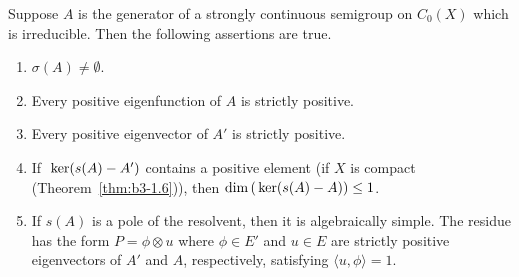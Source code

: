 \begin{proposition}\label{prop:b3-3.5}
	Suppose $A$ is the generator of a strongly continuous semigroup on $C_{0}(X)$ which is irreducible.
	Then the following assertions are true.
	\begin{enumerate}[\upshape (i)]
		\item 
		$\sigma(A) \neq \emptyset$.
		
		\item 
		Every positive eigenfunction of\/ $A$ is strictly positive.
		
		\item 
		Every positive eigenvector of\/ $A'$ is strictly positive.
		
		\item 
		If\ $\mathop{}\mathrm{ker}(s(A) - A')$ contains a positive element (\eg if\/ $X$ is compact (\cf Theorem~\ref{thm:b3-1.6})), then $\dim(\Kern{s(A) - A}) \leq 1$.
		
		\item 
        
		If\/ $s(A)$ is a pole of the resolvent, then it is algebraically simple.
		The residue has the form $P = \phi \otimes u$ where $\phi \in E'$ and $u \in E$ are strictly positive eigenvectors of\/ $A'$ and $A$, respectively, satisfying $\langle u,\phi\rangle = 1$.
	\end{enumerate}
\end{proposition}
